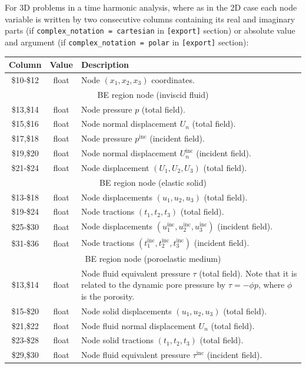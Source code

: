 \documentclass[a4paper,fleqn]{book}
\begin{document}
For 3D problems in a time harmonic analysis, where as in the 2D case each node variable is written by two consecutive columns containing its real and imaginary parts (if \texttt{complex\_notation = cartesian} in \texttt{[export]} section) or absolute value and argument (if \texttt{complex\_notation = polar} in \texttt{[export]} section):
\begin{longtable}{ccp{11cm}}
\textbf{Column} & \textbf{Value} &\textbf{Description} \\ 
\midrule
\$10-\$12 & float & Node $(x_1,x_2,x_3)$ coordinates. \\
\midrule
\multicolumn{3}{c}{BE region node (inviscid fluid)} \\
\$13,\$14 & float & Node pressure $p$ (total field). \\
\$15,\$16 & float & Node normal displacement $U_n$ (total field). \\
\$17,\$18 & float & Node pressure $p^\mathrm{inc}$ (incident field). \\
\$19,\$20 & float & Node normal displacement $U_n^\mathrm{inc}$ (incident field). \\
\$21-\$24 & float & Node displacement $(U_1,U_2,U_3)$ (total field). \\
\midrule
\multicolumn{3}{c}{BE region node (elastic solid)} \\
\$13-\$18 & float & Node displacements $(u_1,u_2,u_3)$ (total field). \\
\$19-\$24 & float & Node tractions $(t_1,t_2,t_3)$ (total field). \\
\$25-\$30 & float & Node displacements $(u_1^\mathrm{inc},u_2^\mathrm{inc},u_3^\mathrm{inc})$ (incident field). \\
\$31-\$36 & float & Node tractions $(t_1^\mathrm{inc},t_2^\mathrm{inc},t_3^\mathrm{inc})$ (incident field). \\
\midrule
\multicolumn{3}{c}{BE region node (poroelastic medium)} \\
\$13,\$14 & float & Node fluid equivalent pressure $\tau$ (total field). Note that it is related to the dynamic pore pressure by $\tau=-\phi p$, where $\phi$ is the porosity.\\
\$15-\$20 & float & Node solid displacements $(u_1,u_2,u_3)$ (total field). \\
\$21,\$22 & float & Node fluid normal displacement $U_n$ (total field). \\
\$23-\$28 & float & Node solid tractions $(t_1,t_2,t_3)$ (total field). \\
\$29,\$30 & float & Node fluid equivalent pressure $\tau^\mathrm{inc}$ (incident field).\\

\end{longtable}
\end{document}
